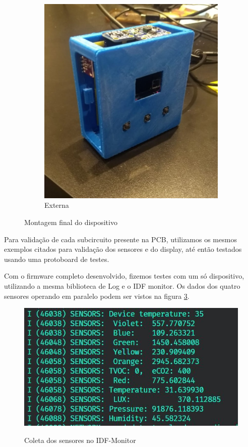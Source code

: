 \documentclass[../monografia.tex]{subfiles}
\begin{document}
\begin{figure}[h]
\begin{subfigure}{0.5\textwidth}
		\includegraphics[width=\textwidth]{montagem-final.jpg}
		\caption{Externa}
		\label{fig:externa}
	\end{subfigure}
	\caption{Montagem final do dispositivo}
	\label{fig:montagem-final}
\end{figure}

Para validação de cada subcircuito presente na PCB, utilizamos os mesmos exemplos citados para validação dos sensores e do display, até então testados usando uma protoboard de testes.

Com o firmware completo desenvolvido, fizemos testes com um só dispositivo, utilizando a mesma biblioteca de Log e o IDF monitor. Os dados dos quatro sensores operando em paralelo podem ser vistos na figura \ref{fig:monitor-sensors}.

\begin{figure}[h]
	\centering
	\includegraphics[width=\textwidth]{monitor-sensors}
	\label{fig:monitor-sensors}
	\caption{Coleta dos sensores no IDF-Monitor}
\end{figure}
\end{document}
